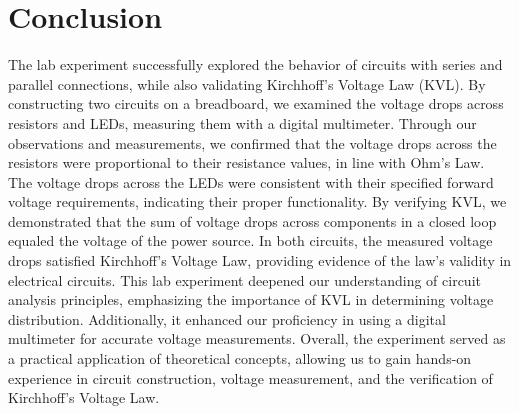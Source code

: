 \section{Conclusion}
The lab experiment successfully explored the behavior of circuits with series and
parallel connections, while also validating Kirchhoff's Voltage Law (KVL). By
constructing two circuits on a breadboard, we examined the voltage drops across
resistors and LEDs, measuring them with a digital multimeter.
Through our observations and measurements, we confirmed that the voltage drops
across the resistors were proportional to their resistance values, in line with Ohm's
Law. The voltage drops across the LEDs were consistent with their specified
forward voltage requirements, indicating their proper functionality.
By verifying KVL, we demonstrated that the sum of voltage drops across
components in a closed loop equaled the voltage of the power source. In both
circuits, the measured voltage drops satisfied Kirchhoff's Voltage Law, providing
evidence of the law's validity in electrical circuits.
This lab experiment deepened our understanding of circuit analysis principles,
emphasizing the importance of KVL in determining voltage distribution.
Additionally, it enhanced our proficiency in using a digital multimeter for accurate
voltage measurements.
Overall, the experiment served as a practical application of theoretical concepts, allowing
us to gain hands-on experience in circuit construction, voltage measurement, and the
verification of Kirchhoff's Voltage Law.

